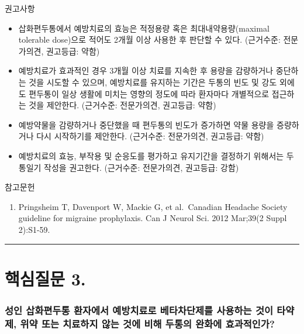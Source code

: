 \documentclass[]{book}
\providecommand{\tightlist}{%
  \setlength{\itemsep}{0pt}\setlength{\parskip}{0pt}}
\begin{document}
권고사항

\begin{itemize}
\item
  삽화편두통에서 예방치료의 효능은 적정용량 혹은 최대내약용량(maximal tolerable dose)으로 적어도 2개월 이상 사용한 후 판단할 수 있다. (근거수준: 전문가의견, 권고등급: 약함)
\item
  예방치료가 효과적인 경우 3개월 이상 치료를 지속한 후 용량을 감량하거나 중단하는 것을 시도할 수 있으며, 예방치료를 유지하는 기간은 두통의 빈도 및 강도 외에도 편두통이 일상 생활에 미치는 영향의 정도에 따라 환자마다 개별적으로 접근하는 것을 제안한다. (근거수준: 전문가의견, 권고등급: 약함)
\item
  예방약물을 감량하거나 중단했을 때 편두통의 빈도가 증가하면 약물 용량을 증량하거나 다시 시작하기를 제안한다. (근거수준: 전문가의견, 권고등급: 약함)
\item
  예방치료의 효능, 부작용 및 순응도를 평가하고 유지기간을 결정하기 위해서는 두통일기 작성을 권고한다. (근거수준: 전문가의견, 권고등급: 강함)
\end{itemize}

참고문헌

\begin{enumerate}
\def\labelenumi{\arabic{enumi}.}
\tightlist
\item
  Pringsheim T, Davenport W, Mackie G, et al.~Canadian Headache Society guideline for migraine prophylaxis. Can J Neurol Sci. 2012 Mar;39(2 Suppl 2):S1-59.
\end{enumerate}

\begin{center}\rule{0.5\linewidth}{\linethickness}\end{center}

\hypertarget{section-12}{%
\section{핵심질문 3.}\label{section-12}}

\hypertarget{section-13}{%
\subsubsection*{성인 삽화편두통 환자에서 예방치료로 베타차단제를 사용하는 것이 타약제, 위약 또는 치료하지 않는 것에 비해 두통의 완화에 효과적인가?}\label{section-13}}
\end{document}
